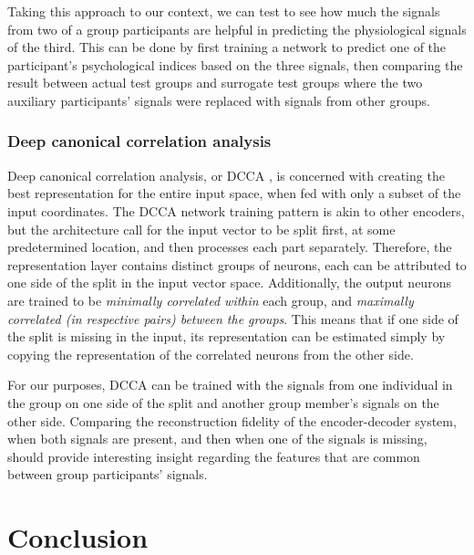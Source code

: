 \documentclass[a4paper, 11pt]{article}      %
\begin{document}
Taking this approach to our context, we can test to see how much the signals from two of a group participants are helpful in predicting the physiological signals of the third. This can be done by first training a network to predict one of the participant's psychological indices based on the three signals, then comparing the result between actual test groups and surrogate test groups where the two auxiliary participants' signals were replaced with signals from other groups.


\subsubsection{Deep canonical correlation analysis}
Deep canonical correlation analysis, or DCCA  \citep{andrew2013deep}, is concerned with creating the best representation for the entire input space, when fed with only a subset of the input coordinates. The DCCA network training pattern is akin to other encoders, but the architecture call for the input vector to be split first, at some predetermined location, and then processes each part separately. Therefore, the representation layer contains distinct groups of neurons, each can be attributed to one side of the split in the input vector space. Additionally, the output neurons are trained to be \emph{minimally correlated within} each group, and \emph{maximally correlated (in respective pairs) between the groups}. This means that if one side of the split is missing in the input, its representation can be estimated simply by copying the representation of the correlated neurons from the other side.

For our purposes, DCCA can be trained with the signals from one individual in the group on one side of the split and another group member's signals on the other side. Comparing the reconstruction fidelity of the encoder-decoder system, when both signals are present, and then when one of the signals is missing, should provide interesting insight regarding the features that are common between group participants' signals.

\section{Conclusion}




\end{document}
